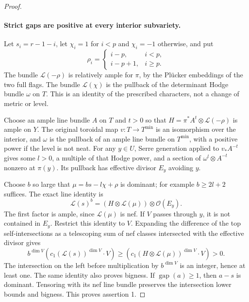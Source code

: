 \begin{proof}
\paragraph{Strict gaps are positive at every interior subvariety.}
Let $s_i=r-1-i$, let $\chi_i=1$ for $i<p$ and $\chi_i=-1$
otherwise, and put
\[
 \rho_i=\begin{cases}i-p,&i<p,\\ i-p+1,&i\ge p.\end{cases}
\]
The bundle $\mathcal L(-\rho)$ is relatively ample for $\pi$,
by the Pl\"ucker embeddings of the two full flags. The bundle
$\mathcal L(\chi)$ is the pullback of the determinant Hodge
bundle $\omega$ on $T$. This is an identity of the prescribed
characters, not a change of metric or level.

Choose an ample line bundle $A$ on $T$ and $t>0$ so that
$H=\pi^*A^t\otimes\mathcal L(-\rho)$ is ample on $Y$.
The original toroidal map $v:T\to T^{\min}$ is an isomorphism
over the interior, and $\omega$ is the pullback of an ample
line bundle on $T^{\min}$, with a positive power if the level
is not neat\cite[Theorem 7.2.4.1(1)--(3)]{positive-lan-pel}.
For any $y\in U$, Serre generation applied to
$v_*A^{-t}$ gives some $l>0$, a multiple of that Hodge power, and a section of
$\omega^l\otimes A^{-t}$ nonzero at $\pi(y)$. Its pullback
has effective divisor $E_y$ avoiding $y$.

Choose $b$ so large that $\mu=bs-l\chi+\rho$ is dominant;
for example $b\ge2l+2$ suffices. The exact line identity is
\[
 \mathcal L(s)^b
  =(H\otimes\mathcal L(\mu))\otimes\mathcal O(E_y).
\]
The first factor is ample, since $\mathcal L(\mu)$ is nef.
If $V$ passes through $y$, it is not contained in $E_y$.
Restrict this identity to $V$. Expanding the difference of
the top self-intersections as a telescoping sum of nef classes
intersected with the effective divisor gives
\[
 b^{\dim V}(c_1(\mathcal L(s))^{\dim V}\cdot V)
   \ge(c_1(H\otimes\mathcal L(\mu))^{\dim V}\cdot V)>0.
\]
The intersection on the left before multiplication by $b^{\dim V}$
is an integer, hence at least one. The same identity also proves
bigness. If $\operatorname{gap}(a)\ge1$, then $a-s$ is
dominant. Tensoring with its nef line bundle preserves the
intersection lower bounds and bigness. This proves assertion 1.


\end{proof}
